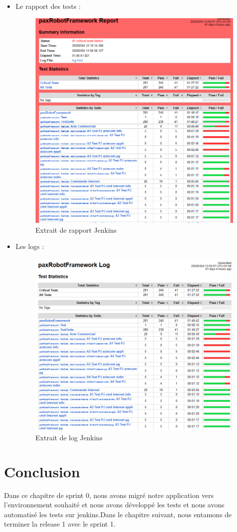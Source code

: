 \begin{itemize}
	\item Le rapport des tests :
	\begin{figure}[H]
		\centering
		\includegraphics[width=0.55\linewidth]{"img/jenkins/exemple report"}
		\caption[Extrait de rapport Jenkins]{Extrait de rapport Jenkins}
		\label{fig:exemple-report}
	\end{figure}
	\item Les logs :
	\begin{figure}[H]
		\centering
		\includegraphics[width=0.55\linewidth]{"img/jenkins/exemple log"}
		\caption[Extrait de log Jenkins]{Extrait de log Jenkins}
		\label{fig:exemple-log}
	\end{figure}
\end{itemize}

\section*{Conclusion}
Dans ce chapitre de sprint 0, nous avons migré notre application vers l’environnement souhaité et nous avons développé les tests et nous avons automatisé les tests sur jenkins.Dans le chapitre suivant, nous entamons de terminer la release 1 avec le sprint 1.



